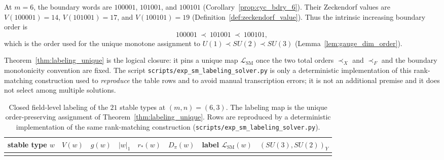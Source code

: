 \begin{remark}[Explicit boundary-value order at $m=6$]\label{rem:boundary_value_order}
At $m=6$, the boundary words are $100001$, $101001$, and $100101$ (Corollary~\ref{prop:cyc_bdry_6}).
Their Zeckendorf values are $V(100001)=14$, $V(101001)=17$, and $V(100101)=19$ (Definition~\ref{def:zeckendorf_value}).
Thus the intrinsic increasing boundary order is
\[
100001\ \prec\ 101001\ \prec\ 100101,
\]
which is the order used for the unique monotone assignment to $U(1)\prec SU(2)\prec SU(3)$ (Lemma~\ref{lem:gauge_dim_order}).
\end{remark}

\begin{remark}
\label{rem:labeling_script_status}
Theorem~\ref{thm:labeling_unique} is the logical closure: it pins a unique map
$\mathcal{L}_{\mathrm{SM}}$ once the two total orders $\prec_X$ and $\prec_F$
and the boundary monotonicity convention are fixed.
The script \texttt{scripts/exp\_sm\_labeling\_solver.py} is only a deterministic
implementation of this rank-matching construction used to \emph{reproduce} the
table rows and to avoid manual transcription errors; it is not an additional
premise and it does not select among multiple solutions.
\end{remark}

\begin{table}[t]
\centering
\small
\setlength{\tabcolsep}{6pt}
\renewcommand{\arraystretch}{1.15}
\begin{tabular}{llllllll}
\toprule
stable type $w$ & $V(w)$ & $g(w)$ & $|w|_1$ & $r_\ast(w)$ & $D_\pi(w)$ & label $\mathcal{L}_{\mathrm{SM}}(w)$ & $(SU(3),SU(2))_Y$ \\
\midrule
%
\\
\bottomrule
\end{tabular}
\caption{Closed field-level labeling of the $21$ stable types at $(m,n)=(6,3)$.
The labeling map is the unique order-preserving assignment of
Theorem~\ref{thm:labeling_unique}.
Rows are reproduced by a deterministic implementation of the same rank-matching
construction (\texttt{scripts/exp\_sm\_labeling\_solver.py}).}
\label{tab:sm_labeling_table}
\end{table}

